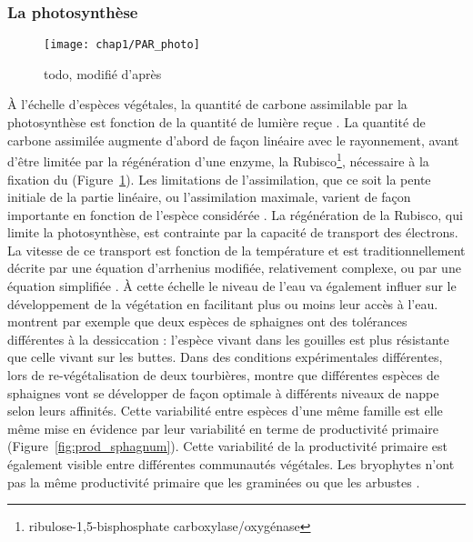 \subsubsection{La photosynthèse}

\begin{figure}
\centering
\texttt{[image: chap1/PAR\_photo]}
\caption{todo, modifié d'après \citet{long1993}}
\label{fig:PAR_photo}
\end{figure}

À l'échelle d'espèces végétales, la quantité de carbone assimilable par la photosynthèse est fonction de la quantité de lumière reçue \citep{long1993}.
La quantité de carbone assimilée augmente d'abord de façon linéaire avec le rayonnement, avant d'être limitée par la régénération d'une enzyme, la Rubisco\footnote{ribulose-1,5-bisphosphate carboxylase/oxygénase}, nécessaire à la fixation du \coo (Figure~\ref{fig:PAR_photo}).
Les limitations de l'assimilation, que ce soit la pente initiale de la partie linéaire, ou l'assimilation maximale, varient de façon importante en fonction de l'espèce considérée \citep{wullschleger1993}.
La régénération de la Rubisco, qui limite la photosynthèse, est contrainte par la capacité de transport des électrons.
La vitesse de ce transport est fonction de la température et est traditionnellement décrite par une équation d'arrhenius modifiée, relativement complexe, ou par une équation simplifiée \citep{farquhar1980,june2004}.
À cette échelle le niveau de l'eau va également influer sur le développement de la végétation en facilitant plus ou moins leur accès à l'eau.
\citet{wagner1984} montrent par exemple que deux espèces de sphaignes ont des tolérances différentes à la dessiccation : l'espèce vivant dans les gouilles est plus résistante que celle vivant sur les buttes.
Dans des conditions expérimentales différentes, lors de re-végétalisation de deux tourbières, \cite{robroek2009} montre que différentes espèces de sphaignes vont se développer de façon optimale à différents niveaux de nappe selon leurs affinités.
Cette variabilité entre espèces d'une même famille est elle même mise en évidence par leur variabilité en terme de productivité primaire (Figure~\ref{fig:prod_sphagnum}).
Cette variabilité de la productivité primaire est également visible entre différentes communautés végétales.
Les bryophytes n'ont pas la même productivité primaire que les graminées ou que les arbustes \citetext{\citealp{moore2002} dans \citealp{rydin2013b}}.
